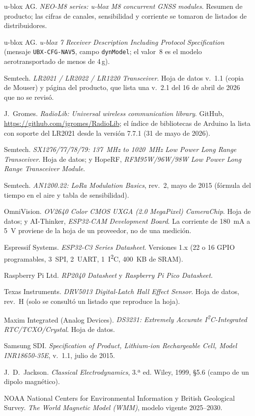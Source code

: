  u-blox AG. \emph{NEO-M8 series: u-blox M8 concurrent GNSS modules}.
  Resumen de producto; las cifras de canales, sensibilidad y corriente se tomaron de listados
  de distribuidores.

 u-blox AG. \emph{u-blox 7 Receiver Description Including Protocol
  Specification} (mensaje \texttt{UBX-CFG-NAV5}, campo \texttt{dynModel}; el valor~8 es el modelo
  aerotransportado de menos de 4\,g).

 Semtech. \emph{LR2021 / LR2022 / LR1220 Transceiver}. Hoja de datos
  v.~1.1 (copia de Mouser) y página del producto, que lista una v.~2.1 del 16 de abril de 2026
  que no se revisó.

 J.~Gromes. \emph{RadioLib: Universal wireless communication
  library}. GitHub, \url{https://github.com/jgromes/RadioLib}; el índice de bibliotecas de
  Arduino la lista con soporte del LR2021 desde la versión 7.7.1 (31 de mayo de 2026).

 Semtech. \emph{SX1276/77/78/79: 137~MHz to 1020~MHz Low Power Long
  Range Transceiver}. Hoja de datos; y HopeRF, \emph{RFM95W/96W/98W Low Power Long Range
  Transceiver Module}.

 Semtech. \emph{AN1200.22: LoRa Modulation Basics}, rev.~2, mayo de 2015
  (fórmula del tiempo en el aire y tabla de sensibilidad).

 OmniVision. \emph{OV2640 Color CMOS UXGA (2.0 MegaPixel) CameraChip}.
  Hoja de datos; y AI-Thinker, \emph{ESP32-CAM Development Board}. La corriente de \SI{180}{mA}
  a \SI{5}{V} proviene de la hoja de un proveedor, no de una medición.

 Espressif Systems. \emph{ESP32-C3 Series Datasheet}. Versiones 1.x
  (22 o 16 GPIO programables, 3~SPI, 2~UART, 1~I\textsuperscript{2}C, 400~KB de SRAM).

 Raspberry Pi Ltd. \emph{RP2040 Datasheet} y \emph{Raspberry Pi Pico
  Datasheet}.

 Texas Instruments. \emph{DRV5013 Digital-Latch Hall Effect Sensor}.
  Hoja de datos, rev.~H (solo se consultó un listado que reproduce la hoja).

 Maxim Integrated (Analog Devices). \emph{DS3231: Extremely Accurate
  I\textsuperscript{2}C-Integrated RTC/TCXO/Crystal}. Hoja de datos.

 Samsung SDI. \emph{Specification of Product, Lithium-ion
  Rechargeable Cell, Model INR18650-35E}, v.~1.1, julio de 2015.

 J.~D.~Jackson. \emph{Classical Electrodynamics}, 3.ª ed. Wiley,
  1999, §5.6 (campo de un dipolo magnético).

 NOAA National Centers for Environmental Information y British
  Geological Survey. \emph{The World Magnetic Model (WMM)}, modelo vigente 2025--2030.
